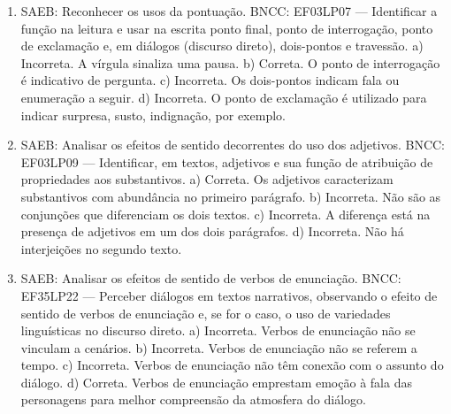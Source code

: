 \begin{enumerate}
\item
SAEB: Reconhecer os usos da pontuação. BNCC: EF03LP07 --- Identificar a função na leitura e usar na escrita ponto final, ponto de interrogação, ponto de exclamação e, em diálogos (discurso direto), dois-pontos e travessão. a) Incorreta. A vírgula sinaliza uma pausa. b) Correta. O ponto de interrogação é indicativo de pergunta. c) Incorreta. Os dois-pontos indicam fala ou enumeração a seguir. d) Incorreta. O ponto de exclamação é utilizado para indicar surpresa, susto, indignação, por exemplo.

\item
SAEB: Analisar os efeitos de sentido decorrentes do uso dos adjetivos. BNCC: EF03LP09 --- Identificar, em textos, adjetivos e sua função de atribuição de propriedades aos substantivos. a) Correta. Os adjetivos caracterizam substantivos com abundância no primeiro parágrafo. b) Incorreta. Não são as conjunções que diferenciam os dois textos. c) Incorreta. A diferença está na presença de adjetivos em um dos dois parágrafos. d) Incorreta. Não há interjeições no segundo texto.

\item
SAEB: Analisar os efeitos de sentido de verbos de enunciação. BNCC: EF35LP22 --- Perceber diálogos em textos narrativos, observando o efeito de sentido de verbos de enunciação e, se for o caso, o uso de variedades linguísticas no discurso direto. a) Incorreta. Verbos de enunciação não se vinculam a cenários. b) Incorreta. Verbos de enunciação não se referem a tempo. c) Incorreta. Verbos de enunciação não têm conexão com o assunto do diálogo. d) Correta. Verbos de enunciação emprestam emoção à fala das personagens para melhor compreensão da atmosfera do diálogo.
\end{enumerate}
